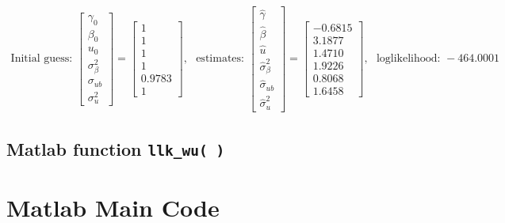 \documentclass[11pt,letter]{article}
\newcommand{\bmat}[1]{\begin{bmatrix} #1 \end{bmatrix}}%
\newcommand{\code}[1]{\texttt{#1}}
\begin{document}
\begin{align*}
\text{Initial guess: }
\bmat{\gamma_0 \\ \beta_0  \\ u_0 \\ \sigma_\beta^2 \\ \sigma_{ub}\\ \sigma_u^2} 
=\bmat{1 \\ 1  \\ 1 \\ 1 \\ 0.9783 \\ 1}, \ \ \  
\text{estimates: }
\bmat{\hat{\gamma} \\ \hat{\beta}  \\ \hat{u} \\ \hat{\sigma}_\beta^2 \\ \hat{\sigma}_{ub}\\ \hat{\sigma}_u^2} 
=\bmat{-0.6815 \\ 3.1877  \\ 1.4710 \\ 1.9226 \\ 0.8068 \\ 1.6458}, \ \ \ 
\text{loglikelihood: }-464.0001
\end{align*}


\subsection*{Matlab function \code{llk\_wu( )}}


\section*{Matlab Main Code}

\end{document}
